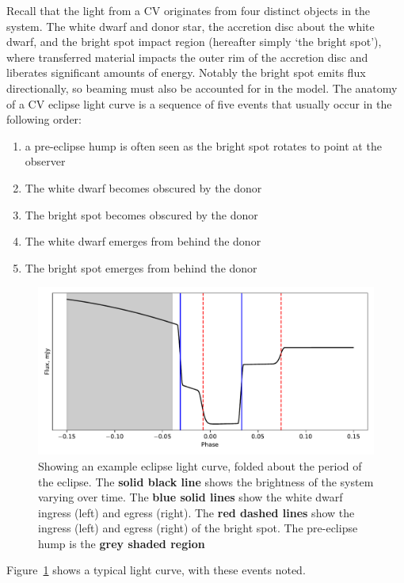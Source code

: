 Recall that the light from a CV originates from four distinct objects in the system. The white dwarf and donor star, the accretion disc about the white dwarf, and the bright spot impact region (hereafter simply `the bright spot'), where transferred material impacts the outer rim of the accretion disc and liberates significant amounts of energy. Notably the bright spot emits flux directionally, so beaming must also be accounted for in the model.
The anatomy of a CV eclipse light curve is a sequence of five events that usually occur in the following order:
\begin{enumerate}
    \setlength\itemsep{0em}
    \item a pre-eclipse hump is often seen as the bright spot rotates to point at the observer
    \item The white dwarf becomes obscured by the donor
    \item The bright spot becomes obscured by the donor
    \item The white dwarf emerges from behind the donor
    \item The bright spot emerges from behind the donor
\end{enumerate}
\begin{figure}
    \centering
    \includegraphics[width=\textwidth]{figures/introduction/example_eclipse.pdf}
    \caption{Showing an example eclipse light curve, folded about the period of the eclipse. The {\bf solid black line} shows the brightness of the system varying over time. The {\bf blue solid lines} show the white dwarf ingress (left) and egress (right). The {\bf red dashed lines} show the ingress (left) and egress (right) of the bright spot. The pre-eclipse hump is the {\bf grey shaded region}}
    \label{fig:introduction:example labelled eclipse light curve}
\end{figure}
Figure~\ref{fig:introduction:example labelled eclipse light curve} shows a typical light curve, with these events noted.

